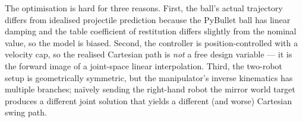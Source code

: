 The optimisation is hard for three reasons. First, the ball's actual
trajectory differs from idealised projectile prediction because the
PyBullet ball has linear damping and the table coefficient of restitution
differs slightly from the nominal value, so the model is biased. Second,
the controller is position-controlled with a velocity cap, so the
realised Cartesian path is \emph{not} a free design variable --- it is the
forward image of a joint-space linear interpolation. Third, the
two-robot setup is geometrically symmetric, but the manipulator's
inverse kinematics has multiple branches; naïvely sending the right-hand
robot the mirror world target produces a different joint solution that
yields a different (and worse) Cartesian swing path.
